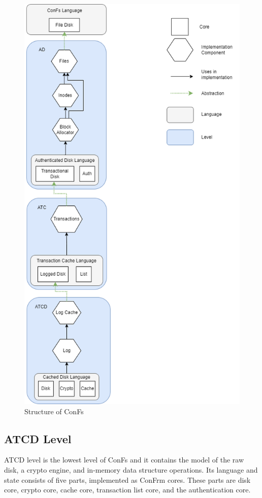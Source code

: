 \begin{figure}[h]
    \centering
    \includegraphics[scale=0.5]{templates/figures/ConFs Layers.png}
    \caption{Structure of ConFs}
    \label{fig:ConFs_Layers}
\end{figure}

\subsection{ATCD Level}
ATCD level is the lowest level of ConFs and it contains the model of the raw disk, a crypto engine, and in-memory data structure operations. Its language and state consists of five parts, implemented as ConFrm cores. These parts are disk core, crypto core, cache core, transaction list core, and the authentication core. 

